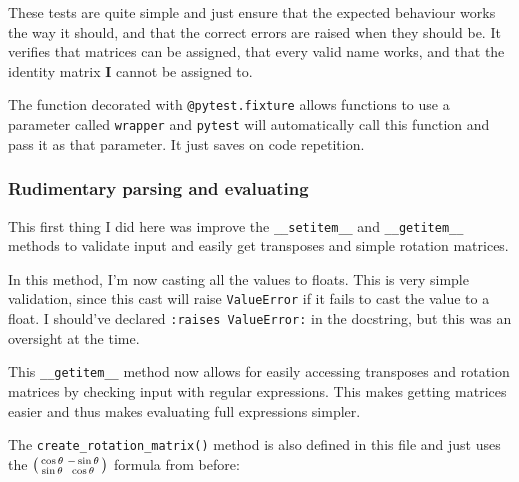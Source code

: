 \documentclass[../main.tex]{subfiles}
\begin{document}

These tests are quite simple and just ensure that the expected behaviour works the way it should, and that the correct errors are raised when they should be. It verifies that matrices can be assigned, that every valid name works, and that the identity matrix \textbf{I} cannot be assigned to.

The function decorated with \texttt{@pytest.fixture} allows functions to use a parameter called \texttt{wrapper} and \texttt{pytest} will automatically call this function and pass it as that parameter. It just saves on code repetition.

\subsubsection{Rudimentary parsing and evaluating\label{development:matrices-backend:rudimentary-parsing-and-evaluating}}

This first thing I did here was improve the \texttt{\_\_setitem\_\_} and \texttt{\_\_getitem\_\_} methods to validate input and easily get transposes and simple rotation matrices.


In this method, I'm now casting all the values to floats. This is very simple validation, since this cast will raise \texttt{ValueError} if it fails to cast the value to a float. I should've declared \texttt{:raises ValueError:} in the docstring, but this was an oversight at the time.


This \texttt{\_\_getitem\_\_} method now allows for easily accessing transposes and rotation matrices by checking input with regular expressions. This makes getting matrices easier and thus makes evaluating full expressions simpler.

The \texttt{create\_rotation\_matrix()} method is also defined in this file and just uses the $\begin{psmallmatrix}\cos\theta & -\sin\theta\\\sin\theta & \cos\theta\end{psmallmatrix}$ formula from before:

\end{document}
